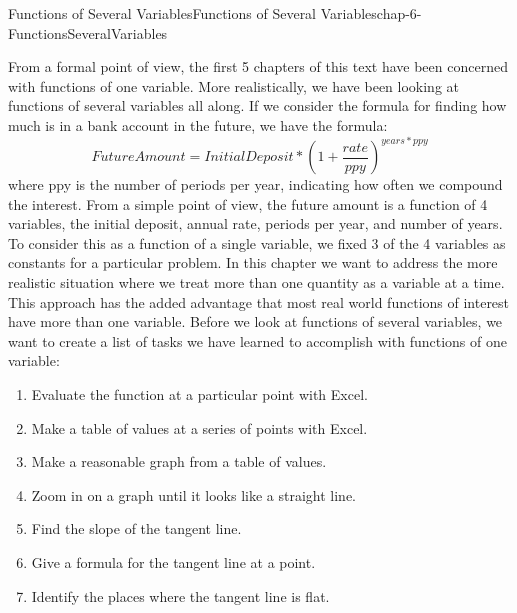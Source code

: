 \documentclass[oneside,10pt,]{book}
\numberwithin{equation}{section}
\begin{document}
\begin{chapterptx}{Functions of Several Variables}{}{Functions of Several Variables}{}{}{chap-6-FunctionsSeveralVariables}
\begin{introduction}{}%
\hypertarget{p-2097}{}%
From a formal point of view, the first 5 chapters of this text have been concerned with functions of one variable.  More realistically, we have been looking at functions of several variables all along.  If we consider the formula for finding how much is in a bank account in the future, we have the formula:%
%
\begin{equation*}
FutureAmount=InitialDeposit*\left(1+\frac{rate}{ppy}\right)^{years*ppy}
\end{equation*}
\hypertarget{p-2098}{}%
where ppy is the number of periods per year, indicating how often we compound the interest.  From a simple point of view, the future amount is a function of 4 variables, the initial deposit, annual rate, periods per year, and number of years.  To consider this as a function of a single variable, we fixed 3 of the 4 variables as constants for a particular problem.  In this chapter we want to address the more realistic situation where we treat more than one quantity as a variable at a time.  This approach has the added advantage that most real world functions of interest have more than one variable. Before we look at functions of several variables, we want to create a list of tasks we have learned to accomplish with functions of one variable:%
\leavevmode%
\begin{enumerate}[label=(\arabic*)]
\item\hypertarget{li-597}{}\hypertarget{p-2099}{}%
Evaluate the function at a particular point with Excel.%
\item\hypertarget{li-598}{}\hypertarget{p-2100}{}%
Make a table of values at a series of points with Excel.%
\item\hypertarget{li-599}{}\hypertarget{p-2101}{}%
Make a reasonable graph from a table of values.%
\item\hypertarget{li-600}{}\hypertarget{p-2102}{}%
Zoom in on a graph until it looks like a straight line.%
\item\hypertarget{li-601}{}\hypertarget{p-2103}{}%
Find the slope of the tangent line.%
\item\hypertarget{li-602}{}\hypertarget{p-2104}{}%
Give a formula for the tangent line at a point.%
\item\hypertarget{li-603}{}\hypertarget{p-2105}{}%
Identify the places where the tangent line is flat.%

\end{enumerate}
\end{introduction}
\end{chapterptx}
\end{document}

